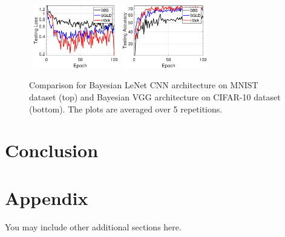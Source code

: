 \documentclass{article} %
\begin{document}
\begin{figure}[H]
{}
\mbox{
\includegraphics[width=0.33\textwidth]{newfigs/testlosscifar.eps}
\includegraphics[width=0.33\textwidth]{newfigs/testacccifar.eps}
}
\caption{Comparison for Bayesian LeNet CNN architecture on MNIST dataset (top) and Bayesian VGG architecture on CIFAR-10 dataset (bottom). The plots are averaged over 5 repetitions.}
    \label{fig:all}
\end{figure}


\section{Conclusion}\label{sec:conclusion}

\newpage




\newpage
\appendix
\section{Appendix}
You may include other additional sections here. 
\end{document}
